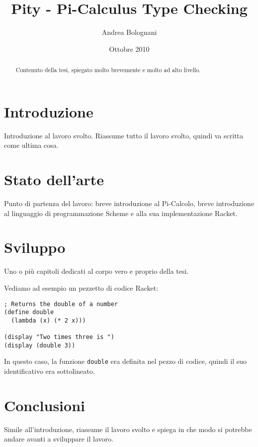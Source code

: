 \documentclass[a4paper]{article}
\begin{document}
\title{Pity - Pi-Calculus Type Checking}
\author{Andrea Bolognani}
\date{Ottobre 2010}

\maketitle


\begin{abstract}
Contenuto della tesi, spiegato molto brevemente e molto ad alto livello.
\end{abstract}


\clearpage

\tableofcontents

\clearpage


\section{Introduzione}

Introduzione al lavoro svolto. Riassume tutto il lavoro svolto, quindi
va scritta come ultima cosa.


\section{Stato dell'arte}

Punto di partenza del lavoro: breve introduzione al Pi-Calcolo, breve
introduzione al linguaggio di programmazione Scheme e alla sua
implementazione Racket.


\section{Sviluppo}

Uno o pi\`u capitoli dedicati al corpo vero e proprio della tesi.

Vediamo ad esempio un pezzetto di codice Racket:

\begin{lstlisting}
; Returns the double of a number
(define double
  (lambda (x) (* 2 x)))

(display "Two times three is ")
(display (double 3))
\end{lstlisting}

In questo caso, la funzione \lstinline{double} era definita nel pezzo
di codice, quindi il suo identificativo era sottolineato.


\section{Conclusioni}

Simile all'introduzione, riassume il lavoro svolto e spiega in che
modo si potrebbe andare avanti a sviluppare il lavoro.
\end{document}
